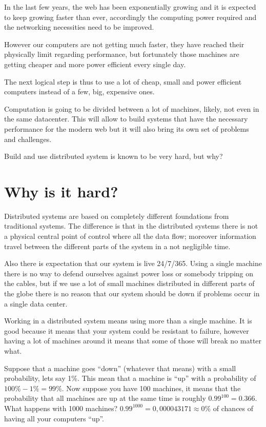 \documentclass[12pt]{article} %
\begin{document}
In the last few years, the web has been exponentially growing and it is expected to keep growing faster than ever, accordingly the computing power required and the networking necessities need to be improved.

However our computers are not getting much faster, they have reached their physically limit regarding performance, but fortunately those machines are getting cheaper and more power efficient every single day.

The next logical step is thus to use a lot of cheap, small and power efficient computers instead of a few, big, expensive ones.

Computation is going to be divided between a lot of machines, likely, not even in the same datacenter. This will allow to build systems that have the necessary performance for the modern web but it will also bring its own set of problems and challenges.

Build and use distributed system is known to be very hard, but why?

\section{Why is it hard?}

Distributed systems are based on completely different foundations from traditional systems. The difference is that in the distributed systems there is not a physical central point of control where all the data flow; moreover information travel between the different parts of the system in a not negligible time.

Also there is expectation that our system is live 24/7/365. Using a single machine there is no way to defend ourselves against power loss or somebody tripping on the cables, but if we use a lot of small machines distributed in different parts of the globe there is no reason that our system should be down if problems occur in a single data center. 

Working in a distributed system means using more than a single machine. It is good because it means that your system could be resistant to failure, however having a lot of machines around it means that some of those will break no matter what.

Suppose that a machine goes ``down'' (whatever that means) with a small probability, lets say 1\%. This mean that a machine is ``up'' with a probability of $ 100\%-1\% = 99\%$. Now suppose you have 100 machines, it means that the probability that all machines are up at the same time is roughly $ 0.99^{100} = 0.366 $. What happens with 1000 machines? $0.99 ^ {1000} = 0,000043171 \approx 0 \%$ of chances of having all your computers ``up''.
\end{document}
